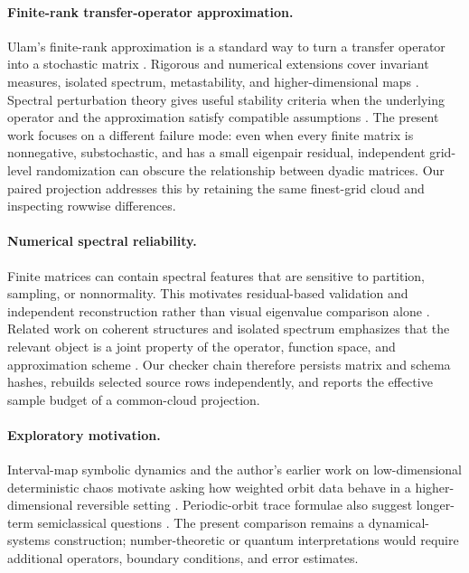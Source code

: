 \paragraph{Finite-rank transfer-operator approximation.}
Ulam's finite-rank approximation is a standard way to turn a transfer operator
into a stochastic matrix \citep{Ulam1960,Keller1982}.  Rigorous and numerical
extensions cover invariant measures, isolated spectrum, metastability, and
higher-dimensional maps \citep{Froyland1995,Froyland1998,Froyland2007,
DellnitzJunge1999,Bugiel1996,BahsounBoseDuan2015}.  Spectral perturbation
theory gives useful stability criteria when the underlying operator and the
approximation satisfy compatible assumptions \citep{KellerLiverani1999,
Liverani1995,BlankKeller1998,BlankKeller1997}.  The present work focuses on a
different failure mode: even when every finite matrix is nonnegative,
substochastic, and has a small eigenpair residual, independent grid-level
randomization can obscure the relationship between dyadic matrices.  Our
paired projection addresses this by retaining the same finest-grid cloud and
inspecting rowwise differences.

\paragraph{Numerical spectral reliability.}
Finite matrices can contain spectral features that are sensitive to partition,
sampling, or nonnormality.  This motivates residual-based validation and
independent reconstruction rather than visual eigenvalue comparison alone
\citep{HerwigEtAl2025,Nisoli2026}.  Related work on coherent structures and
isolated spectrum emphasizes that the relevant object is a joint property of
the operator, function space, and approximation scheme
\citep{FroylandLloydQuas2010,FroylandMurrayStancevic2011,
FroylandDellnitz2003}.  Our checker chain therefore persists matrix and schema
hashes, rebuilds selected source rows independently, and reports the effective
sample budget of a common-cloud projection.

\paragraph{Exploratory motivation.}
Interval-map symbolic dynamics and the author's earlier work on
low-dimensional deterministic chaos motivate asking how weighted orbit data
behave in a higher-dimensional reversible setting
\citep{MilnorThurston1988,ColletEckmann1980,Wang2026PrimeChaos}.  Periodic-orbit
trace formulae also suggest longer-term semiclassical questions
\citep{Gutzwiller1990,CvitanovicArtuso2009}.  The present comparison remains a
dynamical-systems construction; number-theoretic or quantum interpretations
would require additional operators, boundary conditions, and error estimates.
